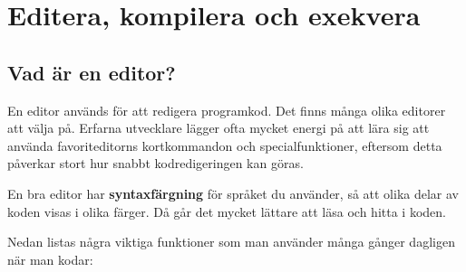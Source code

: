 
\chapter{Editera, kompilera och exekvera}\label{appendix:compile}

\section{Vad är en editor?}

En editor används för att redigera programkod. Det finns många olika editorer att välja på. Erfarna utvecklare lägger ofta mycket energi på att lära sig att använda favoriteditorns kortkommandon och specialfunktioner, eftersom detta påverkar stort hur snabbt kodredigeringen kan göras.

En bra editor har \textbf{syntaxfärgning} för språket du använder, så att olika delar av koden visas i olika färger. Då går det mycket lättare att läsa och hitta i koden.

Nedan listas några viktiga funktioner som man använder många gånger dagligen när man kodar:

